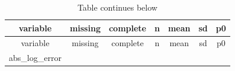 \documentclass[]{book}
\theoremstyle{definition}
\theoremstyle{definition}
\theoremstyle{definition}
\theoremstyle{remark}
\begin{document}
\begin{longtable}[]{@{}ccccccc@{}}
\caption{Table continues below}\tabularnewline
\toprule
\begin{minipage}[b]{0.20\columnwidth}\centering\strut
variable\strut
\end{minipage} & \begin{minipage}[b]{0.11\columnwidth}\centering\strut
missing\strut
\end{minipage} & \begin{minipage}[b]{0.12\columnwidth}\centering\strut
complete\strut
\end{minipage} & \begin{minipage}[b]{0.10\columnwidth}\centering\strut
n\strut
\end{minipage} & \begin{minipage}[b]{0.11\columnwidth}\centering\strut
mean\strut
\end{minipage} & \begin{minipage}[b]{0.09\columnwidth}\centering\strut
sd\strut
\end{minipage} & \begin{minipage}[b]{0.09\columnwidth}\centering\strut
p0\strut
\end{minipage}\tabularnewline
\midrule
\endfirsthead
\toprule
\begin{minipage}[b]{0.20\columnwidth}\centering\strut
variable\strut
\end{minipage} & \begin{minipage}[b]{0.11\columnwidth}\centering\strut
missing\strut
\end{minipage} & \begin{minipage}[b]{0.12\columnwidth}\centering\strut
complete\strut
\end{minipage} & \begin{minipage}[b]{0.10\columnwidth}\centering\strut
n\strut
\end{minipage} & \begin{minipage}[b]{0.11\columnwidth}\centering\strut
mean\strut
\end{minipage} & \begin{minipage}[b]{0.09\columnwidth}\centering\strut
sd\strut
\end{minipage} & \begin{minipage}[b]{0.09\columnwidth}\centering\strut
p0\strut
\end{minipage}\tabularnewline
\midrule
\endhead
\begin{minipage}[t]{0.20\columnwidth}\centering\strut
abs\_log\_error\strut
\end{minipage} & \begin{minipage}[t]{0.11\columnwidth}\centering\strut

\end{minipage}
\end{longtable}
\end{document}
